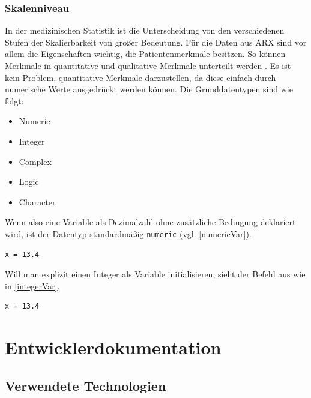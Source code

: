 \documentclass[a4paper, 12pt]{report} %
\begin{document}
\subsection{Skalenniveau}
In der medizinischen Statistik ist die Unterscheidung von den verschiedenen Stufen der Skalierbarkeit von großer Bedeutung. Für die Daten aus ARX sind vor allem die Eigenschaften wichtig, die Patientenmerkmale besitzen. So können Merkmale in quantitative und qualitative Merkmale unterteilt werden \cite{skalenniveau}. Es ist kein Problem, quantitative Merkmale darzustellen, da diese einfach durch numerische Werte ausgedrückt werden können. Die Grunddatentypen sind wie folgt:

\begin{itemize}
\item Numeric
\item Integer
\item Complex
\item Logic
\item Character
\end{itemize}

Wenn also eine Variable als Dezimalzahl ohne zusätzliche Bedingung deklariert wird, ist der Datentyp standardmäßig \texttt{numeric} (vgl. \ref{numericVar}).

\lstset{language=R}
\begin{lstlisting}[frame=single, caption = Deklarierung einer numerischen Variable x]
x = 13.4
\end{lstlisting}
\label{numericVar}

Will man explizit einen Integer als Variable initialisieren, sieht der Befehl aus wie in \ref{integerVar}.

\lstset{language=R}
\begin{lstlisting}[frame=single, caption = Deklarierung einer numerischen Variable x]
x = 13.4
\end{lstlisting}
\label{numericVar}




\newpage

\chapter{Entwicklerdokumentation}

\section{Verwendete Technologien}
\end{document}
